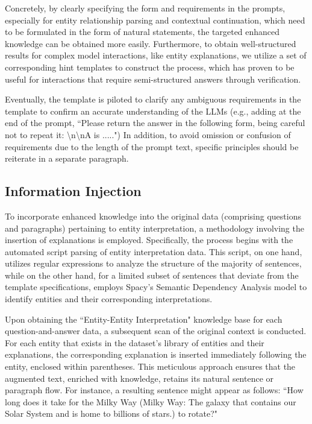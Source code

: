 Concretely, by clearly specifying the form and requirements in the prompts, especially for entity relationship parsing and contextual continuation, which need to be formulated in the form of natural statements, the targeted enhanced knowledge can be obtained more easily.
Furthermore, to obtain well-structured results for complex model interactions, like entity explanations, we utilize a set of corresponding hint templates to construct the process, which has proven to be useful for interactions that require semi-structured answers through verification. 

Eventually, the template is piloted to clarify any ambiguous requirements in the template to confirm an accurate understanding of the LLMs (e.g., adding at the end of the prompt, ``Please return the answer in the following form, being careful not to repeat it: \textbackslash n\textbackslash nA is .....")  In addition, to avoid omission or confusion of requirements due to the length of the prompt text, specific principles should be reiterate in a separate paragraph.

\subsection{Information Injection}

To incorporate enhanced knowledge into the original data (comprising questions and paragraphs) pertaining to entity interpretation, a methodology involving the insertion of explanations is employed. Specifically, the process begins with the automated script parsing of entity interpretation data. This script, on one hand, utilizes regular expressions to analyze the structure of the majority of sentences, while on the other hand, for a limited subset of sentences that deviate from the template specifications, employs Spacy's Semantic Dependency Analysis model to identify entities and their corresponding interpretations.

Upon obtaining the ``Entity-Entity Interpretation" knowledge base for each question-and-answer data, a subsequent scan of the original context is conducted. For each entity that exists in the dataset's library of entities and their explanations, the corresponding explanation is inserted immediately following the entity, enclosed within parentheses. This meticulous approach ensures that the augmented text, enriched with knowledge, retains its natural sentence or paragraph flow. For instance, a resulting sentence might appear as follows: ``How long does it take for the Milky Way (Milky Way: The galaxy that contains our Solar System and is home to billions of stars.) to rotate?" 

